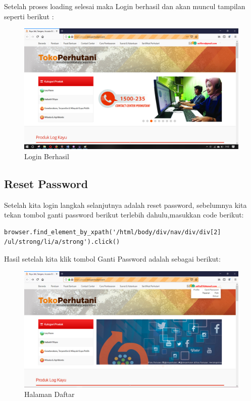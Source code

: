 Setelah proses loading selesai maka Login berhasil dan akan muncul tampilan seperti berikut :
\begin{figure}[h]
 	\centering
 	\includegraphics[scale=0.25]{figures/2login}
 	\caption{Login Berhasil}
\end{figure}

\newpage
\subsection{Reset Password}
Setelah kita login langkah selanjutnya adalah reset password, sebelumnya kita tekan tombol ganti password berikut terlebih dahulu,masukkan code berikut:

\begin{verbatim}
browser.find_element_by_xpath('/html/body/div/nav/div/div[2]
/ul/strong/li/a/strong').click()
\end{verbatim} 

Hasil setelah kita klik tombol Ganti Password adalah sebagai berikut: 
\begin{figure}[h]
	\centering
	\includegraphics[scale=0.32]{figures/1GantiPassword}
	\caption{Halaman Daftar}
\end{figure}


